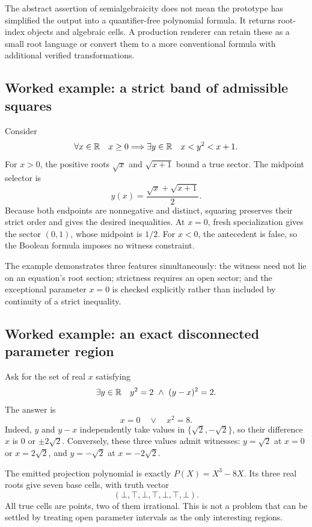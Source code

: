 The abstract assertion of semialgebraicity does not mean the prototype has simplified the output into a quantifier-free polynomial formula. It returns root-index objects and algebraic cells. A production renderer can retain these as a small root language or convert them to a more conventional formula with additional verified transformations.

\subsection{Worked example: a strict band of admissible squares}
Consider
\[
 \forall x\in\mathbb R\quad x\geq0\Longrightarrow
 \exists y\in\mathbb R\quad x<y^2<x+1.
\]
For $x>0$, the positive roots $\sqrt x$ and $\sqrt{x+1}$ bound a true sector. The midpoint selector is
\[
 y(x)=\frac{\sqrt x+\sqrt{x+1}}2.
\]
Because both endpoints are nonnegative and distinct, squaring preserves their strict order and gives the desired inequalities. At $x=0$, fresh specialization gives the sector $(0,1)$, whose midpoint is $1/2$. For $x<0$, the antecedent is false, so the Boolean formula imposes no witness constraint.

The example demonstrates three features simultaneously: the witness need not lie on an equation's root section; strictness requires an open sector; and the exceptional parameter $x=0$ is checked explicitly rather than included by continuity of a strict inequality.

\subsection{Worked example: an exact disconnected parameter region}
\label{sec:shifted}
Ask for the set of real $x$ satisfying
\[
 \exists y\in\R\quad y^2=2\ \wedge\ (y-x)^2=2.
\]
The answer is
\begin{equation}\label{eq:shifted-answer}
 x=0\quad\vee\quad x^2=8.
\end{equation}
Indeed, $y$ and $y-x$ independently take values in $\{\sqrt2,-\sqrt2\}$, so their difference $x$ is $0$ or $\pm2\sqrt2$. Conversely, these three values admit witnesses: $y=\sqrt2$ at $x=0$ or $x=2\sqrt2$, and $y=-\sqrt2$ at $x=-2\sqrt2$.

The emitted projection polynomial is exactly $P(X)=X^3-8X$. Its three real roots give seven base cells, with truth vector
\[
 (\bot,\top,\bot,\top,\bot,\top,\bot).
\]
All true cells are points, two of them irrational. This is not a problem that can be settled by treating open parameter intervals as the only interesting regions.

